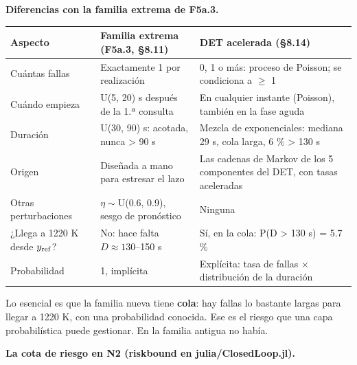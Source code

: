 \documentclass[11pt,a4paper]{article}
\newcommand{\codeus}{\textunderscore\allowbreak}
\newcommand{\code}[1]{{\small\ttfamily\let\_\codeus #1}}
\begin{document}
\textbf{Diferencias con la familia extrema de F5a.3.}

{\small
\begin{xltabular}{\linewidth}{@{}YYY@{}}
\toprule
\textbf{Aspecto} & \textbf{Familia extrema (F5a.3, \S{}8.11)} & \textbf{DET acelerada (\S{}8.14)} \\
\midrule
\endhead
Cuántas fallas & Exactamente 1 por realización & 0, 1 o más: proceso de Poisson; se condiciona a $\ge$ 1 \\
Cuándo empieza & U(5, 20) s después de la 1.ª consulta & En cualquier instante (Poisson), también en la fase aguda \\
Duración & U(30, 90) s: acotada, nunca > 90 s & Mezcla de exponenciales: mediana 29 s, cola larga, 6 \% > 130 s \\
Origen & Diseñada a mano para estresar el lazo & Las cadenas de Markov de los 5 componentes del DET, con tasas aceleradas \\
Otras perturbaciones & $\eta\sim$U(0.6, 0.9), sesgo de pronóstico & Ninguna \\
¿Llega a 1220 K desde $y_{\rm ref}$? & No: hace falta $D\approx130$–150 s & Sí, en la cola: P(D > 130 s) = 5.7 \% \\
Probabilidad & 1, implícita & Explícita: tasa de fallas $\times$ distribución de la duración \\
\bottomrule
\end{xltabular}}

Lo esencial es que la familia nueva tiene \textbf{cola}: hay fallas lo bastante largas para llegar a 1220 K, con una probabilidad conocida. Ese es el riesgo que una capa probabilística puede gestionar. En la familia antigua no había.

\textbf{La cota de riesgo en N2 (\code{risk\_bound} en \code{julia/ClosedLoop.jl}).}
\end{document}
